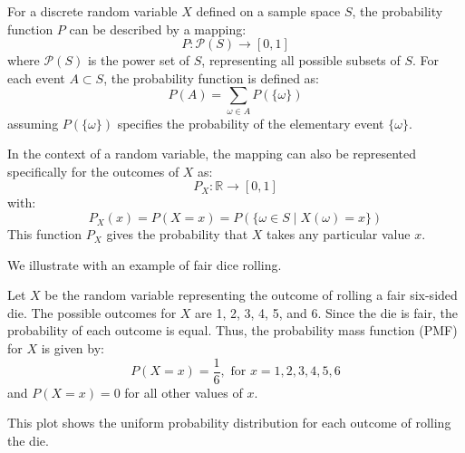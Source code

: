\begin{definition}
    For a discrete random variable \( X \) defined on a sample space \( S \), the probability function \( P \) can be described by a mapping:
    \[
    P: \mathcal{P}(S) \to [0, 1]
    \]
    where \( \mathcal{P}(S) \) is the power set of \( S \), representing all possible subsets of \( S \). For each event \( A \subset S \), the probability function is defined as:
    \[
    P(A) = \sum_{\omega \in A} P(\{\omega\})
    \]
    assuming \( P(\{\omega\}) \) specifies the probability of the elementary event \( \{\omega\} \).
    
    In the context of a random variable, the mapping can also be represented specifically for the outcomes of \( X \) as:
    \[
    P_X: \mathbb{R} \to [0, 1]
    \]
    with:
    \[
    P_X(x) = P(X = x) = P(\{\omega \in S \mid X(\omega) = x\})
    \]
    This function \( P_X \) gives the probability that \( X \) takes any particular value \( x \).    
\end{definition}

We illustrate with an example of fair dice rolling.
\begin{example}
    Let \( X \) be the random variable representing the outcome of rolling a fair six-sided die. The possible outcomes for \( X \) are 1, 2, 3, 4, 5, and 6. Since the die is fair, the probability of each outcome is equal. Thus, the probability mass function (PMF) for \( X \) is given by:
    \[
    P(X = x) = \frac{1}{6}, \text{ for } x = 1, 2, 3, 4, 5, 6
    \]
    and \( P(X = x) = 0 \) for all other values of \( x \).
    
        
    
    This plot shows the uniform probability distribution for each outcome of rolling the die.
    
\end{example}



